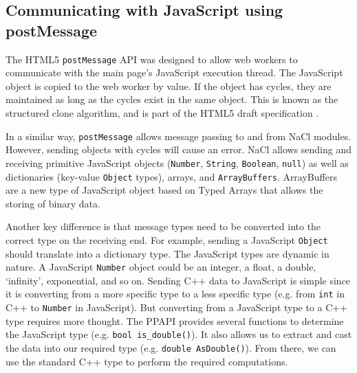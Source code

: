 
\subsection{Communicating with JavaScript using postMessage} %
\label{sub:postmessage_intro}
The HTML5 \lstinline+postMessage+ API was designed to allow web workers to communicate with the main page's JavaScript execution thread. The JavaScript object is copied to the web worker by value. If the object has cycles, they are maintained as long as the cycles exist in the same object. This is known as the structured clone algorithm, and is part of the HTML5 draft specification \cite{html5w3c}. 

In a similar way, \lstinline+postMessage+ allows message passing to and from NaCl modules. However, sending objects with cycles will cause an error. NaCl allows sending and receiving primitive JavaScript objects (\lstinline+Number+, \lstinline+String+, \lstinline+Boolean+, \lstinline+null+) as well as dictionaries (key-value \lstinline+Object+ types), arrays, and \lstinline+ArrayBuffers+. ArrayBuffers are a new type of JavaScript object based on Typed Arrays \cite{typedarraysw3c} that allows the storing of binary data. 

Another key difference is that message types need to be converted into the correct type on the receiving end. For example, sending a JavaScript \lstinline+Object+ should translate into a dictionary type. The JavaScript types are dynamic in nature. A JavaScript \lstinline+Number+ object could be an integer, a float, a double, `infinity', exponential, and so on. Sending C++ data to JavaScript is simple since it is converting from a more specific type to a less specific type (e.g. from \lstinline+int+ in C++ to \lstinline+Number+ in JavaScript). But converting from a JavaScript type to a C++ type requires more thought. The PPAPI provides several functions to determine the JavaScript type (e.g. \lstinline+bool is_double()+). It also allows us to extract and cast the data into our required type (e.g. \lstinline+double AsDouble()+). From there, we can use the standard C++ type to perform the required computations.


